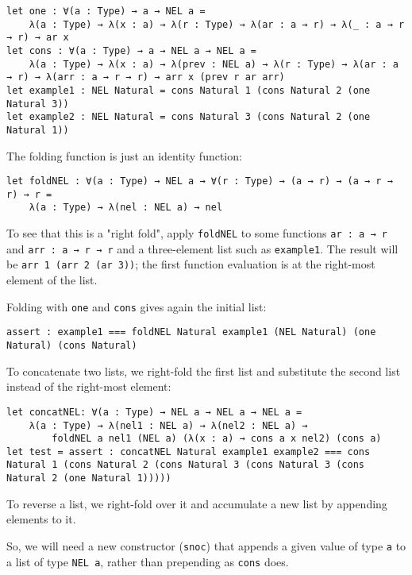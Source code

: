 \begin{lstlisting}[language=Dhall]
let one : ∀(a : Type) → a → NEL a =
    λ(a : Type) → λ(x : a) → λ(r : Type) → λ(ar : a → r) → λ(_ : a → r → r) → ar x
let cons : ∀(a : Type) → a → NEL a → NEL a =
    λ(a : Type) → λ(x : a) → λ(prev : NEL a) → λ(r : Type) → λ(ar : a → r) → λ(arr : a → r → r) → arr x (prev r ar arr)
let example1 : NEL Natural = cons Natural 1 (cons Natural 2 (one Natural 3))
let example2 : NEL Natural = cons Natural 3 (cons Natural 2 (one Natural 1))
\end{lstlisting}


The folding function is just an identity function:


\begin{lstlisting}[language=Dhall]
let foldNEL : ∀(a : Type) → NEL a → ∀(r : Type) → (a → r) → (a → r → r) → r =
    λ(a : Type) → λ(nel : NEL a) → nel
\end{lstlisting}


To see that this is a "right fold", apply \lstinline!foldNEL! to some functions \lstinline!ar : a → r! and \lstinline!arr : a → r → r! and a three-element list such as \lstinline!example1!. The result
will be \lstinline!arr 1 (arr 2 (ar 3))!; the first function evaluation is at the right-most element of the list.


Folding with \lstinline!one! and \lstinline!cons! gives again the initial list:


\begin{lstlisting}[language=Dhall]
assert : example1 === foldNEL Natural example1 (NEL Natural) (one Natural) (cons Natural)
\end{lstlisting}


To concatenate two lists, we right-fold the first list and substitute the second list instead of the right-most element:


\begin{lstlisting}[language=Dhall]
let concatNEL: ∀(a : Type) → NEL a → NEL a → NEL a =
    λ(a : Type) → λ(nel1 : NEL a) → λ(nel2 : NEL a) →
        foldNEL a nel1 (NEL a) (λ(x : a) → cons a x nel2) (cons a)
let test = assert : concatNEL Natural example1 example2 === cons Natural 1 (cons Natural 2 (cons Natural 3 (cons Natural 3 (cons Natural 2 (one Natural 1)))))
\end{lstlisting}


To reverse a list, we right-fold over it and accumulate a new list by appending elements to it.


So, we will need a new constructor (\lstinline!snoc!) that appends a given value of type \lstinline!a! to a list of type \lstinline!NEL a!, rather than prepending as \lstinline!cons! does.


